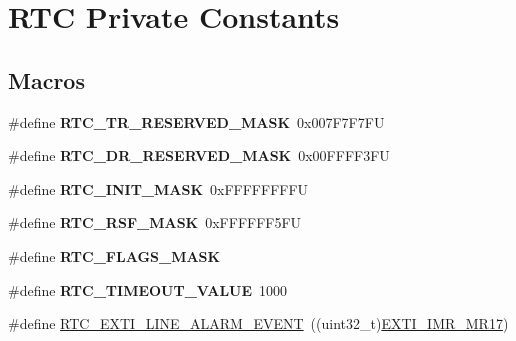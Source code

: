\hypertarget{group___r_t_c___private___constants}{}\section{R\+TC Private Constants}
\label{group___r_t_c___private___constants}
\subsection*{Macros}
\begin{DoxyCompactItemize}
\item 
\mbox{\label{group___r_t_c___private___constants_gacc08d7d212e235f4b04bb88f5567fa54}} 
\#define {\bfseries R\+T\+C\+\_\+\+T\+R\+\_\+\+R\+E\+S\+E\+R\+V\+E\+D\+\_\+\+M\+A\+SK}~0x007\+F7\+F7\+FU
\item 
\mbox{\label{group___r_t_c___private___constants_ga16855eaae542f992c93170492822d058}} 
\#define {\bfseries R\+T\+C\+\_\+\+D\+R\+\_\+\+R\+E\+S\+E\+R\+V\+E\+D\+\_\+\+M\+A\+SK}~0x00\+F\+F\+F\+F3\+FU
\item 
\mbox{\label{group___r_t_c___private___constants_ga0dbaf639bc171f2055c9055d538f13df}} 
\#define {\bfseries R\+T\+C\+\_\+\+I\+N\+I\+T\+\_\+\+M\+A\+SK}~0x\+F\+F\+F\+F\+F\+F\+F\+FU
\item 
\mbox{\label{group___r_t_c___private___constants_ga3a1033490aaf8304e1522d551bd1a7b9}} 
\#define {\bfseries R\+T\+C\+\_\+\+R\+S\+F\+\_\+\+M\+A\+SK}~0x\+F\+F\+F\+F\+F\+F5\+FU
\item 
\#define {\bfseries R\+T\+C\+\_\+\+F\+L\+A\+G\+S\+\_\+\+M\+A\+SK}
\item 
\mbox{\label{group___r_t_c___private___constants_gaca17c243759056a49a411f6324dd6123}} 
\#define {\bfseries R\+T\+C\+\_\+\+T\+I\+M\+E\+O\+U\+T\+\_\+\+V\+A\+L\+UE}~1000
\item 
\#define \hyperlink{group___r_t_c___private___constants_gaeffe9b89372b06df1c0eff2f4346682b}{R\+T\+C\+\_\+\+E\+X\+T\+I\+\_\+\+L\+I\+N\+E\+\_\+\+A\+L\+A\+R\+M\+\_\+\+E\+V\+E\+NT}~((uint32\+\_\+t)\hyperlink{group___peripheral___registers___bits___definition_ga4489fa85d1552b8f40faed93483a5d35}{E\+X\+T\+I\+\_\+\+I\+M\+R\+\_\+\+M\+R17})
\end{DoxyCompactItemize}


